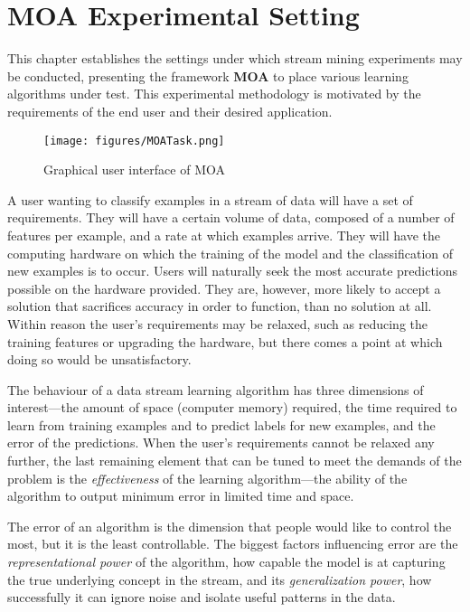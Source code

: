 \chapter{MOA Experimental Setting}
\label{chap:experimentalsetting} 

This chapter establishes the settings under which stream mining experiments may be conducted, presenting the framework \textbf{MOA} %
 to place various learning algorithms under test.
This experimental methodology %
is motivated by the requirements of the end user and their desired application.

\begin{figure}[ht]
\begin{center}
\texttt{[image: figures/MOATask.png]}\end{center}
\caption{Graphical user interface of MOA}
\end{figure}

A user wanting to classify examples in a stream of data will have a set of requirements. They will have a certain volume of data, composed of a number of features per example, and a rate at which examples arrive. They will have the computing hardware on which the training of the model and the classification of new examples is to occur.
Users will naturally seek the most accurate predictions possible on the hardware provided. They are, however, more likely to accept a solution that sacrifices accuracy in order to function, than no solution at all. Within reason the user's requirements may be relaxed, such as reducing the training features or upgrading the hardware, but there comes a point at which doing so would be unsatisfactory.

The behaviour of a data stream learning algorithm has three dimensions of interest---the amount of space (computer memory) required, the time required to learn from training examples and to predict labels for new examples, and the error of the predictions.
When the user's requirements cannot be relaxed any further, the last remaining element that can be tuned to meet the demands of the problem is the {\em effectiveness} of the learning algorithm---the ability of the algorithm to output minimum error in limited time and space.

The error of an algorithm is the dimension that people would like to control the most, but it is the least controllable. The biggest factors influencing error are the {\em representational power} of the algorithm, how capable the model is at capturing the true underlying concept in the stream, and its {\em generalization power}, how successfully it can ignore noise and isolate useful patterns in the data.

